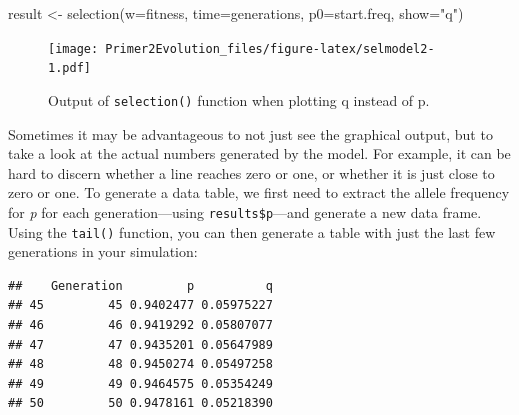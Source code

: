 \documentclass[
]{book}
\newenvironment{Shaded}{\begin{snugshade}}{\end{snugshade}}
\newcommand{\AttributeTok}[1]{\textcolor[rgb]{0.77,0.63,0.00}{#1}}
\newcommand{\CommentTok}[1]{\textcolor[rgb]{0.56,0.35,0.01}{\textit{#1}}}
\newcommand{\DecValTok}[1]{\textcolor[rgb]{0.00,0.00,0.81}{#1}}
\newcommand{\FunctionTok}[1]{\textcolor[rgb]{0.00,0.00,0.00}{#1}}
\newcommand{\NormalTok}[1]{#1}
\newcommand{\OtherTok}[1]{\textcolor[rgb]{0.56,0.35,0.01}{#1}}
\newcommand{\SpecialCharTok}[1]{\textcolor[rgb]{0.00,0.00,0.00}{#1}}
\newcommand{\StringTok}[1]{\textcolor[rgb]{0.31,0.60,0.02}{#1}}
\begin{document}
\begin{Shaded}
\begin{Highlighting}[]
\NormalTok{result }\OtherTok{\textless{}{-}} \FunctionTok{selection}\NormalTok{(}\AttributeTok{w=}\NormalTok{fitness, }\AttributeTok{time=}\NormalTok{generations, }\AttributeTok{p0=}\NormalTok{start.freq, }\AttributeTok{show=}\StringTok{"q"}\NormalTok{)}
\end{Highlighting}
\end{Shaded}

\begin{figure}
\centering
\texttt{[image: Primer2Evolution\_files/figure-latex/selmodel2-1.pdf]}
\caption{\label{fig:selmodel2}Output of \texttt{selection()} function when plotting q instead of p.}
\end{figure}

Sometimes it may be advantageous to not just see the graphical output, but to take a look at the actual numbers generated by the model. For example, it can be hard to discern whether a line reaches zero or one, or whether it is just close to zero or one. To generate a data table, we first need to extract the allele frequency for \emph{p} for each generation---using \texttt{results\$p}---and generate a new data frame. Using the \texttt{tail()} function, you can then generate a table with just the last few generations in your simulation:

\begin{Shaded}
\end{Shaded}

\begin{verbatim}
##    Generation         p          q
## 45         45 0.9402477 0.05975227
## 46         46 0.9419292 0.05807077
## 47         47 0.9435201 0.05647989
## 48         48 0.9450274 0.05497258
## 49         49 0.9464575 0.05354249
## 50         50 0.9478161 0.05218390
\end{verbatim}
\end{document}

